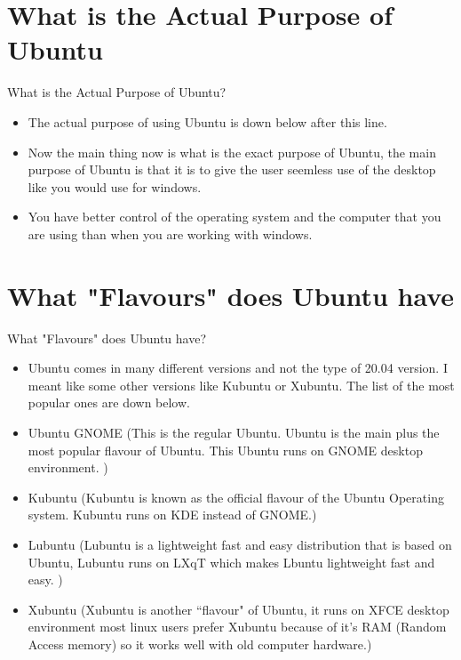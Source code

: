 \documentclass[aspectratio=43]{beamer}
\begin{document}
\section{What is the Actual Purpose of Ubuntu}
\begin{frame}{What is the Actual Purpose of Ubuntu?}
	\begin{itemize}
		\item The actual purpose of using Ubuntu is down below after this line.
		\item Now the main thing now is what is the exact purpose of Ubuntu, the 		main purpose of Ubuntu is that it is to give the user seemless use of the desktop 		like you would use for windows.
	\item You have better control of the operating system and the computer that you are using than when you are working with windows.
	\end{itemize}
\end{frame}



	\section{What "Flavours" does Ubuntu have }
	\begin{frame}{What "Flavours" does Ubuntu have?}
	\begin{block}{}
	\begin{itemize}
	\item Ubuntu comes in many different versions and not the type of 20.04 version. I meant like some other versions like Kubuntu or Xubuntu. The list of the most popular ones are down below.
	\item Ubuntu GNOME (This is the regular Ubuntu. Ubuntu is the main plus the most popular flavour of Ubuntu. This Ubuntu runs on GNOME desktop environment. )
	\item Kubuntu (Kubuntu is known as the official flavour of the Ubuntu Operating system. Kubuntu runs on KDE instead of GNOME.)
	\item Lubuntu (Lubuntu is a lightweight fast and easy distribution that is based on Ubuntu, Lubuntu runs on LXqT which makes Lbuntu lightweight fast and easy. )
	\item Xubuntu (Xubuntu is another ``flavour" of Ubuntu, it runs on XFCE desktop environment most linux users prefer Xubuntu because of it's RAM (Random Access memory) so it works well with old computer hardware.)
	\end{itemize}
	\end{block}
	\end{frame}
\end{document}
